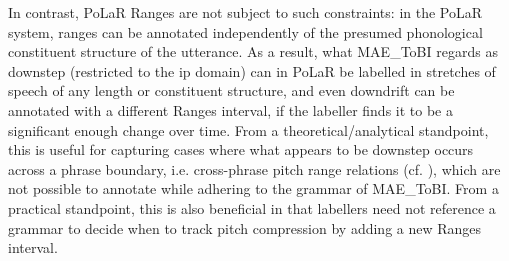 In contrast, PoLaR Ranges are not subject to such constraints: in the PoLaR system, ranges can be annotated independently of the presumed phonological constituent structure of the utterance. As a result, what MAE\_ToBI regards as downstep (restricted to the ip domain) can in PoLaR be labelled in stretches of speech of any length or constituent structure, and even downdrift can be annotated with a different Ranges interval, if the labeller finds it to be a significant enough change over time. From a theoretical\slash analytical standpoint, this is useful for capturing cases where what appears to be downstep occurs across a phrase boundary, i.e. cross-phrase pitch range relations (cf. \citealt{ladd88, brugos15}), which are not possible to annotate while adhering to the grammar of MAE\_ToBI. From a practical standpoint, this is also beneficial in that labellers need not reference a grammar to decide when to track pitch compression by adding a new Ranges interval.

